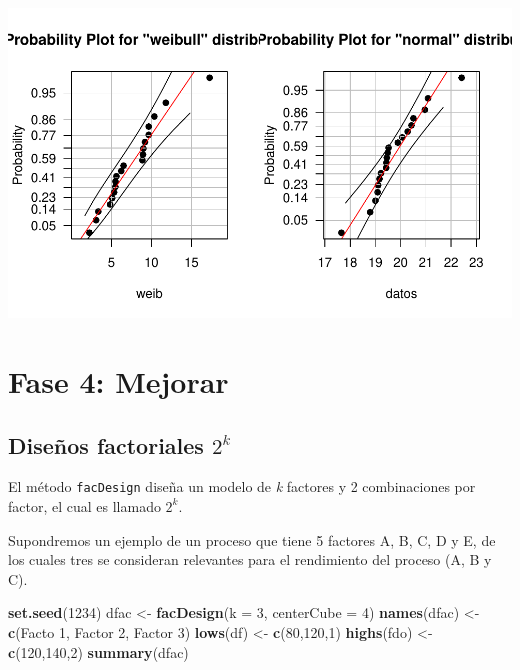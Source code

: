 \documentclass[
]{book}
\newenvironment{Shaded}{\begin{snugshade}}{\end{snugshade}}
\newcommand{\AttributeTok}[1]{\textcolor[rgb]{0.13,0.29,0.53}{#1}}
\newcommand{\DecValTok}[1]{\textcolor[rgb]{0.00,0.00,0.81}{#1}}
\newcommand{\FunctionTok}[1]{\textcolor[rgb]{0.13,0.29,0.53}{\textbf{#1}}}
\newcommand{\NormalTok}[1]{#1}
\newcommand{\OtherTok}[1]{\textcolor[rgb]{0.56,0.35,0.01}{#1}}
\newcommand{\StringTok}[1]{\textcolor[rgb]{0.31,0.60,0.02}{#1}}
\begin{document}
\begin{center}\includegraphics{Libro_TidyQualityTools_files/figure-latex/unnamed-chunk-88-1} \end{center}

\hypertarget{fase-4-mejorar}{%
\section{Fase 4: Mejorar}\label{fase-4-mejorar}}

\hypertarget{diseuxf1os-factoriales-2k}{%
\subsection{\texorpdfstring{Diseños factoriales \(2^{k}\)}{Diseños factoriales 2\^{}\{k\}}}\label{diseuxf1os-factoriales-2k}}

El método \texttt{facDesign} diseña un modelo de \emph{k} factores y 2 combinaciones por factor, el cual es llamado \(2^k\).

Supondremos un ejemplo de un proceso que tiene 5 factores A, B, C, D y E, de los cuales tres se consideran relevantes para el rendimiento del proceso (A, B y C).

\begin{Shaded}
\begin{Highlighting}[]
\FunctionTok{set.seed}\NormalTok{(}\DecValTok{1234}\NormalTok{)}
\NormalTok{dfac }\OtherTok{\textless{}{-}} \FunctionTok{facDesign}\NormalTok{(}\AttributeTok{k =} \DecValTok{3}\NormalTok{, }\AttributeTok{centerCube =} \DecValTok{4}\NormalTok{)}
\FunctionTok{names}\NormalTok{(dfac) }\OtherTok{\textless{}{-}} \FunctionTok{c}\NormalTok{(}\StringTok{\textquotesingle{}Facto 1\textquotesingle{}}\NormalTok{, }\StringTok{\textquotesingle{}Factor 2\textquotesingle{}}\NormalTok{, }\StringTok{\textquotesingle{}Factor 3\textquotesingle{}}\NormalTok{)}
\FunctionTok{lows}\NormalTok{(df) }\OtherTok{\textless{}{-}} \FunctionTok{c}\NormalTok{(}\DecValTok{80}\NormalTok{,}\DecValTok{120}\NormalTok{,}\DecValTok{1}\NormalTok{)}
\FunctionTok{highs}\NormalTok{(fdo) }\OtherTok{\textless{}{-}} \FunctionTok{c}\NormalTok{(}\DecValTok{120}\NormalTok{,}\DecValTok{140}\NormalTok{,}\DecValTok{2}\NormalTok{)}
\FunctionTok{summary}\NormalTok{(dfac)}
\end{Highlighting}
\end{Shaded}
\end{document}
